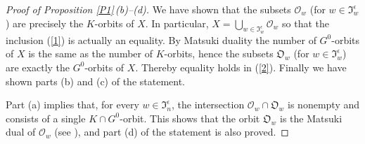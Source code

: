 \documentclass{amsart}
\theoremstyle{definition}
\begin{document}
\begin{proof}[Proof of Proposition \ref{P1}\,{\rm (b)}--{\rm (d)}]
We have shown that the subsets $\mathcal{O}_w$ (for
$w\in\mathfrak{I}^\epsilon_w$) are precisely the $K$-orbits of $X$. In
particular, $X=\bigcup_{w\in\mathfrak{I}^\epsilon_w}\mathcal{O}_w$ so
that the inclusion (\ref{1}) is actually an equality. By Matsuki duality the
number of $G^0$-orbits of $X$ is the same as the number of
$K$-orbits, hence the subsets $\mathfrak{O}_w$ (for
$w\in\mathfrak{I}^\epsilon_w$) are exactly the $G^0$-orbits of $X$.
Thereby equality holds in (\ref{2}). Finally we have shown parts
{\rm (b)} and {\rm (c)} of the statement.

Part (a) implies that,  for every $w\in\mathfrak{I}_n^\epsilon$, the intersection $\mathcal{O}_w\cap\mathfrak{O}_w$ is nonempty and consists of a single $K\cap G^0$-orbit.
This shows that the orbit $\mathfrak{O}_w$ is the Matsuki dual of $\mathcal{O}_w$ (see \cite{Matsuki3}), and part {\rm (d)} of the statement is also proved.
\end{proof}
\end{document}
